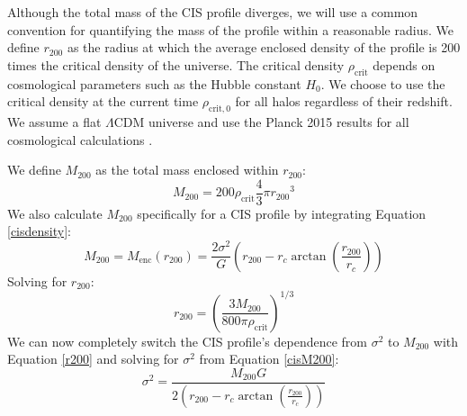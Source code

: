 \documentclass[10pt]{article}
\begin{document}
Although the total mass of the CIS profile diverges, we will use a common convention for quantifying the mass of the profile within a reasonable radius. We define $r_{200}$ as the radius at which the average enclosed density of the profile is 200 times the critical density of the universe. The critical density $\rho_\mathrm{crit}$ depends on cosmological parameters such as the Hubble constant $H_0$. We choose to use the critical density at the current time $\rho_\mathrm{crit,0}$ for all halos regardless of their redshift. We assume a flat $\Lambda$CDM universe and use the Planck 2015 results for all cosmological calculations \citep{PlanckCollaboration2015}.

We define $M_{200}$ as the total mass enclosed within $r_{200}$:
\begin{equation} \label{M200}
M_{200} = 200 \rho_\mathrm{crit} \frac{4}{3} \pi {r_{200}}^3
\end{equation}
We also calculate $M_{200}$ specifically for a CIS profile by integrating Equation \ref{cisdensity}:
\begin{equation} \label{cisM200}
M_{200} = M_\mathrm{enc}(r_{200}) = \frac{2 \sigma^2}{G} \left( r_{200} - r_c \arctan{\left(\frac{r_{200}}{r_c}\right)} \right)
\end{equation}
Solving for $r_{200}$:
\begin{equation} \label{r200}
r_{200} = \left( \frac{3 M_{200}}{800 \pi \rho_\mathrm{crit}} \right)^{1/3}
\end{equation}
We can now completely switch the CIS profile's dependence from $\sigma^2$ to $M_{200}$ with Equation \ref{r200} and solving for $\sigma^2$ from Equation \ref{cisM200}:
\begin{equation}
\sigma^2 = \frac{M_{200} G}{2 \left( r_{200} - r_c \arctan{\left(\frac{r_{200}}{r_c}\right)} \right)}
\end{equation}
\end{document}
